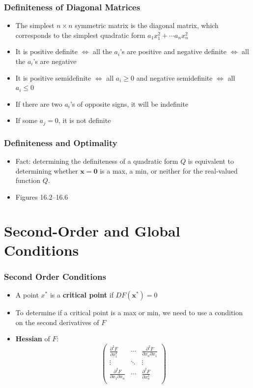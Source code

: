 \documentclass[9pt,aspectratio=169]{beamer}
\begin{document}
\begin{frame}
	\frametitle{Definiteness of Diagonal Matrices}
\begin{itemize}
	\item The simplest $n\times n$ symmetric matrix is the diagonal matrix,
    which corresponds to the simplest quadratic form $a_1x_1^2+\cdots
    a_nx_n^2$
	\item It is positive definite $\iff$ all the $a_i$'s are positive and
    negative definite $\iff$ all the $a_i$'s are negative
	\item It is positive semidefinite $\iff$ all $a_i \geq 0$ and negative
    semidefinite $\iff$ all $a_i \leq 0$
	\item If there are two $a_i$'s of opposite signs, it will be indefinite
	\item If some $a_j = 0$, it is not definite
\end{itemize}
\end{frame}

\begin{frame}
\frametitle{Definiteness and Optimality}
\begin{itemize}
	\item Fact: determining the definiteness of a quadratic form $Q$ is
    equivalent to determining whether $\mathbf{x} = \mathbf{0}$ is a max, a
    min, or neither for the real-valued function $Q$.
    \item Figures 16.2--16.6
\end{itemize}
\end{frame}

\section{Second-Order and Global Conditions}

\begin{frame}
	\frametitle{Second Order Conditions}
	\begin{itemize}	
        \item A point $x^*$ is a \textbf{critical point} if $DF(\mathbf{x}^*)
        = 0$
		\item To determine if a critical point is a max or min, we need to
        use a condition on the second derivatives of $F$
		\item \textbf{Hessian} of $F$: 
			$$\left({\begin{array}{ccc} 
				\frac{\partial^2 F}{\partial x_1^2} & \cdots &\frac{\partial^2 F}{\partial x_n\partial x_1}\\
				\vdots & \ddots & \vdots\\
				\frac{\partial^2 F}{\partial x_1\partial x_n} & \cdots & \frac{\partial^2 F}{\partial x_n^2}\\			
				\end{array}}\right)$$
	\end{itemize}
\end{frame}
\end{document}
